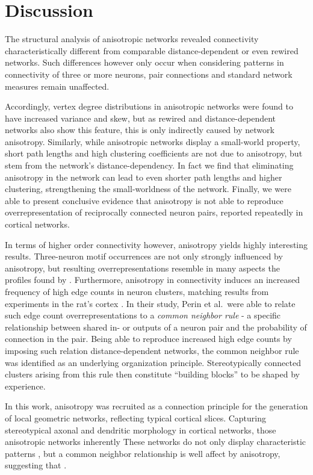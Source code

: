 

\section{Discussion}\label{sec:discussion}

The structural analysis of anisotropic networks revealed connectivity
characteristically different from comparable distance-dependent or
even rewired networks. Such differences however only occur when
considering patterns in connectivity of three or more neurons, pair
connections and standard network measures remain unaffected.

Accordingly, vertex degree distributions in anisotropic networks were
found to have increased variance and skew, but as rewired and
distance-dependent networks also show this feature, this is only
indirectly caused by network anisotropy. Similarly, while
an\-iso\-tro\-pic networks display a small-world property, short path
lengths and high clustering coefficients are not due to anisotropy,
but stem from the network's distance-dependency. In fact we find that
eliminating anisotropy in the network can lead to even shorter path
lengths and higher clustering, strengthening the small-worldness of
the network. Finally, we were able to present conclusive evidence that
anisotropy is not able to reproduce overrepresentation of reciprocally
connected neuron pairs, reported repeatedly in cortical networks.

In terms of higher order connectivity however, anisotropy yields
highly interesting results. Three-neuron motif occurrences are not
only strongly influenced by anisotropy, but resulting
overrepresentations resemble in many aspects the profiles found by
\textcite{Song2005}. Furthermore, anisotropy in connectivity induces
an increased frequency of high edge counts in neuron clusters,
matching results from experiments in the rat's
cortex \parencite{Perin2011}. In their study, Perin et al.\ were able
to relate such edge count overrepresentations to a \textit{common
  neighbor rule} - a specific relationship between shared in- or
outputs of a neuron pair and the probability of connection in the
pair. Being able to reproduce increased high edge counts by imposing
such relation distance-dependent networks, the common neighbor rule
was identified as an underlying organization
principle. Stereotypically connected clusters arising from this rule
then constitute \enquote{building blocks} to be shaped by experience.

In this work, anisotropy was recruited as a connection principle for
the generation of local geometric networks, reflecting typical
cortical slices. Capturing stereotypical axonal and dendritic
morphology in cortical networks, those anisotropic networks inherently
These networks do not only display characteristic patterns , but a
common neighbor relationship is well affect by anisotropy, suggesting
that . 


